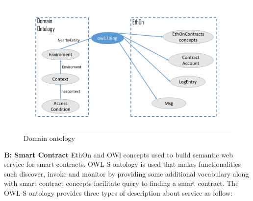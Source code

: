 \begin{center}
	\begin{figure}[htb!]
		
		\begin{minipage}{0.55\linewidth}
			\centering
			\includegraphics[width=1.95\textwidth]{images/chap02_Domain_EthOn.png}
		\end{minipage}
		\caption[Domain ONtology]{Domain ontology \cite{Baqa}}
		
	\end{figure}
	
\end{center} 

\textbf{B: Smart Contract}
 EthOn and OWl concepts used to build semantic web service for smart contracts. OWL-S ontology is used that makes functionalities such discover, invoke and monitor by providing some additional vocabulary along with smart contract concepts facilitate query to finding a smart contract. The OWL-S ontology provides three types of description about service as follow: \\


